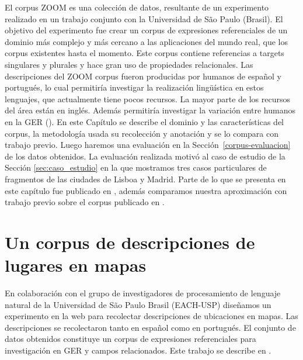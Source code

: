 El corpus ZOOM es una colecci\'on de datos, resultante de un experimento realizado en un trabajo conjunto con la Universidad de S\~ao Paulo (Brasil). El objetivo del experimento fue crear un corpus de expresiones referenciales de un dominio m\'as complejo y m\'as cercano a las aplicaciones del mundo real, que los corpus existentes hasta el momento. Este corpus contiene referencias a targets singulares y plurales y hace gran uso de propiedades relacionales. Las descripciones del ZOOM corpus fueron producidas por humanos de espa\~nol y portugu\'es, lo cual permitir\'ia investigar la realizaci\'on ling\"u\'istica en estos lenguajes, que actualmente tiene pocos recursos. La mayor parte de los recursos del \'area est\'an en ingl\'es. Adem\'as permitir\'ia investigar la variaci\'on entre humanos en la GER (\cite{trainable-speaker,arec:2012:coling12,non-det}). 
En este Cap\'itulo se describe el dominio y las caracter\'isticas del corpus, la metodolog\'ia usada su recolecci\'on y anotaci\'on y se lo compara con trabajo previo. Luego haremos una evaluaci\'on en la Secci\'on~\ref{corpus-evaluacion} de los datos obtenidos. La evaluaci\'on realizada motiv\'o al caso de estudio de la Secci\'on \ref{sec:caso_estudio} en la que mostramos tres casos particulares de fragmentos de las ciudades de Lisboa y Madrid. Parte de lo que se presenta en este cap\'itulo fue publicado en \cite{DBLP:conf/acl/AltamiranoFPB15}, adem\'as comparamos nuestra aproximaci\'on con trabajo previo sobre el corpus publicado en \cite{thiago-svm}.

\section{Un corpus de descripciones de lugares en mapas}


En colaboraci\'on con el grupo de investigadores de procesamiento de lenguaje natural de la Universidad de S\~ao Paulo Brasil (EACH-USP) dise\~namos un experimento en la web para recolectar descripciones de ubicaciones en mapas. Las descripciones se recolectaron tanto en espa\~nol como en portugu\'es. El conjunto de datos obtenidos constituye un corpus de expresiones referenciales para investigaci\'on en GER y campos relacionados. Este trabajo se describe en \cite{DBLP:conf/acl/AltamiranoFPB15}.

